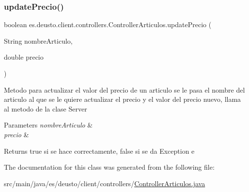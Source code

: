 \subsubsection{\texorpdfstring{updatePrecio()}{updatePrecio()}}
{\footnotesize\ttfamily boolean es.\+deusto.\+client.\+controllers.\+Controller\+Articulos.\+update\+Precio (\begin{DoxyParamCaption}\item[{String}]{nombre\+Articulo,  }\item[{double}]{precio }\end{DoxyParamCaption})}

Metodo para actualizar el valor del precio de un articulo se le pasa el nombre del articulo al que se le quiere actualizar el precio y el valor del precio nuevo, llama al metodo de la clase Server 
\begin{DoxyParams}{Parameters}
{\em nombre\+Articulo} & \\
\hline
{\em precio} & \\
\hline
\end{DoxyParams}
\begin{DoxyReturn}{Returns}
true si se hace correctamente, false si se da Exception e 
\end{DoxyReturn}


The documentation for this class was generated from the following file\+:\begin{DoxyCompactItemize}
\item 
src/main/java/es/deusto/client/controllers/\mbox{\hyperlink{_controller_articulos_8java}{Controller\+Articulos.\+java}}\end{DoxyCompactItemize}
